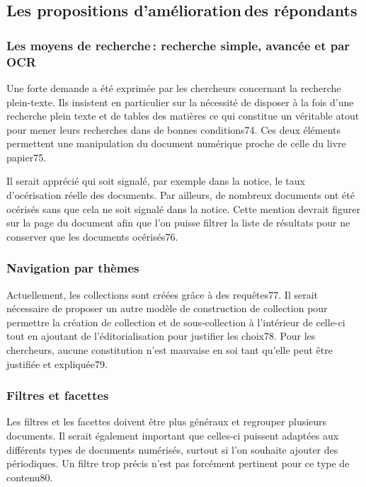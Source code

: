 \subsection{Les propositions d’amélioration des répondants}

\subsubsection{Les moyens de recherche : recherche simple, avancée et par OCR}

Une forte demande a été exprimée par les chercheurs concernant la recherche plein-texte. Ils insistent en particulier sur la nécessité de disposer à la fois d’une recherche plein texte et de tables des matières ce qui constitue un véritable atout pour mener leurs recherches dans de bonnes conditions74. Ces deux éléments permettent une manipulation du document numérique proche de celle du livre papier75.  

Il serait apprécié qui soit signalé, par exemple dans la notice, le taux d’océrisation réelle des documents. Par ailleurs, de nombreux documents ont été océrisés sans que cela ne soit signalé dans la notice. Cette mention devrait figurer sur la page du document afin que l’on puisse filtrer la liste de résultats pour ne conserver que les documents océrisés76. 

\subsubsection{Navigation par thèmes}  

Actuellement, les collections sont créées grâce à des requêtes77. Il serait nécessaire de proposer un autre modèle de construction de collection pour permettre la création de collection et de sous-collection à l’intérieur de celle-ci tout en ajoutant de l’éditorialisation pour justifier les choix78. Pour les chercheurs, aucune constitution n’est mauvaise en soi tant qu’elle peut être justifiée et expliquée79. 

\subsubsection{Filtres et facettes} 

Les filtres et les facettes doivent être plus généraux et regrouper plusieurs documents. Il serait également important que celles-ci puissent adaptées aux différents types de documents numérisés, surtout si l’on souhaite ajouter des périodiques. Un filtre trop précis n’est pas forcément pertinent pour ce type de contenu80.  

